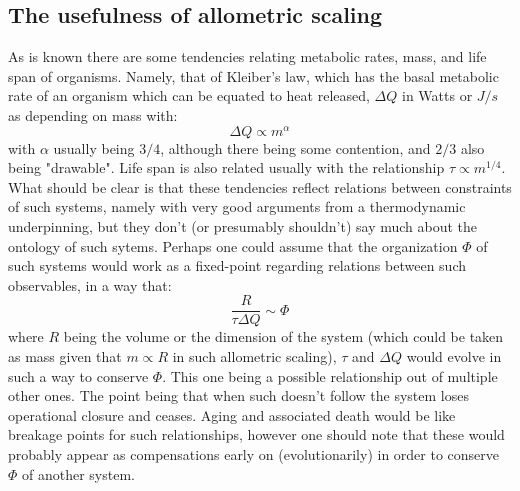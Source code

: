 \documentclass[a4paper,12pt,twoside,leqno]{article}
\begin{document}
\subsection*{The usefulness of allometric scaling}
As is known there are some tendencies relating metabolic rates, mass, and life span of organisms. Namely, that of Kleiber's law, which has the basal metabolic rate of an organism which can be equated to heat released, $\Delta Q$ in Watts or $J/s$ as depending on mass with:
$$
\Delta Q \propto m^{\alpha}
$$ 
with $\alpha$ usually being $3/4$, although there being some contention, and $2/3$ also being "drawable". Life span is also related usually with the relationship $\tau \propto m^{1/4}$.\\
What should be clear is that these tendencies reflect relations between constraints of such systems, namely with very good arguments from a thermodynamic underpinning, but they don't (or presumably shouldn't) say much about the ontology of such sytems. Perhaps one could assume that the organization $\Phi$ of such systems would work as a fixed-point regarding relations between such observables, in a way that:
$$
\frac{R}{\tau\Delta Q} \sim \Phi
$$
where $R$ being the volume or the dimension of the system (which could be taken as mass given that $m \propto R$ in such allometric scaling), $\tau$ and $\Delta Q$ would evolve in such a way to conserve $\Phi$. This one being a possible relationship out of multiple other ones. The point being that when such doesn't follow the system loses operational closure and ceases. Aging and associated death would be like breakage points for such relationships, however one should note that these would probably appear as compensations early on (evolutionarily) in order to conserve $\Phi$ of another system.
\end{document}
